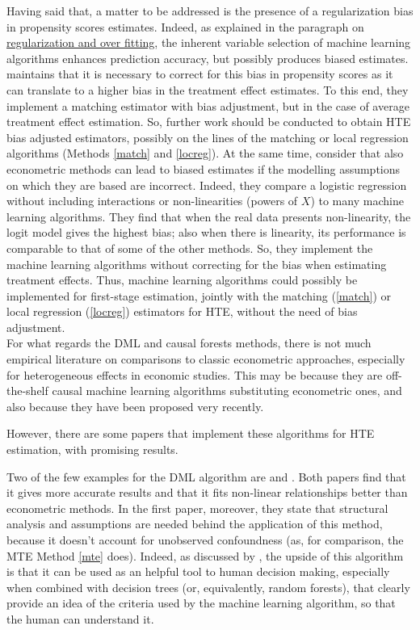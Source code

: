\documentclass[12pt,a4paper,openright,twoside]{book}
\newcommand{\customref}[2]{\hyperref[#1]{#2}}
\begin{document}
\begin{doublespacing}
Having said that, a matter to be addressed is the presence of a regularization bias in propensity scores estimates. Indeed, as explained in the paragraph on \customref{regofcv}{regularization and over fitting}, the inherent variable selection of machine learning algorithms enhances prediction accuracy, but possibly produces biased estimates. \citet{goller2020does} maintains that it is necessary to correct for this bias in propensity scores as it can translate to a higher bias in the treatment effect estimates. To this end, they implement a matching estimator with bias adjustment, but in the case of average treatment effect estimation. So, further work should be conducted to obtain HTE bias adjusted estimators, possibly on the lines of the matching or local regression algorithms (Methods \ref{match} and \ref{locreg}). 
At the same time, \citet{lee2010improving} consider that also econometric methods can lead to biased estimates if the modelling assumptions on which they are based are incorrect. Indeed, they compare a logistic regression without including interactions or non-linearities (powers of $X$) to many machine learning algorithms. They find that when the real data presents non-linearity, the logit model gives the highest bias;  also when there is linearity, its performance is comparable to that of some of the other methods. So, they implement the machine learning algorithms without correcting for the bias when estimating treatment effects. Thus, machine learning algorithms could possibly be implemented for first-stage estimation, jointly with the matching (\ref{match}) or local regression (\ref{locreg}) estimators for HTE, without the need of bias adjustment. \\

For what regards the DML and causal forests methods, there is not much empirical literature on comparisons to classic econometric approaches, especially for heterogeneous effects in economic studies. This may be because they are off-the-shelf causal machine learning algorithms substituting econometric ones, and also because they have been proposed very recently.

However, there are some papers that implement these algorithms for HTE estimation, with promising results. 

Two of the few examples for the DML algorithm are \citet{fuhr2024estimating} and \citealp{wangetal}. Both papers find that it gives more accurate results and that it fits non-linear relationships better than econometric methods. In the first paper, moreover, they state that structural analysis and assumptions are needed behind the application of this method, because it doesn't account for unobserved confoundness (as, for comparison, the MTE Method \ref{mte} does). 
Indeed, as discussed by \citet{lechner2023}, the upside of this algorithm is that it can be used as an helpful tool to human decision making, especially when combined with decision trees (or, equivalently, random forests), that clearly provide an idea of the criteria used by the machine learning algorithm, so that the human can understand it. 


\end{doublespacing}
\end{document}
